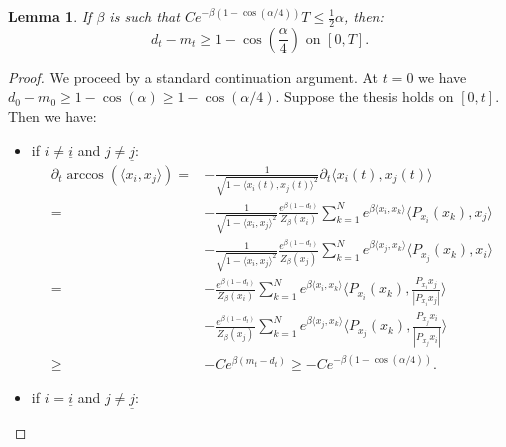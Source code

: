 \documentclass{article}
\numberwithin{theorem}{section}
\newtheorem{lemma}[theorem]{Lemma}
\begin{document}
\begin{lemma}
    \label{lem:md}
If $\beta$ is such that $Ce^{-\beta(1-\cos(\alpha/4))}T\leq\frac{1}{2}\alpha$, then: 
$$
d_t-m_t \geq 1-\cos\left(\frac{\alpha}{4}\right)\text{ on } [0,T].
$$
\end{lemma}
\begin{proof} We proceed by a standard continuation argument. 
At $t=0$ we have $d_0-m_0\geq 1-\cos(\alpha)\geq 1-\cos(\alpha/4)$.
Suppose the thesis holds on $[0,t]$.
Then we have: 
\begin{itemize}
\item if $i\neq\underline{i}$ and $j\neq\underline{j}$:
\begin{align*}
\partial_t \arccos(\langle x_i, x_j\rangle) =& -\frac{1}{\sqrt{1-\langle x_i(t), x_j(t)\rangle^2}}\partial_t \langle x_i(t), x_j(t)\rangle\\
=&-\frac{1}{\sqrt{1-\langle x_i, x_j\rangle^2}} \frac{e^{\beta(1-d_t)}}{Z_\beta(x_i)}\sum_{k=1}^N e^{\beta\langle x_i, x_k\rangle}  \langle P_{x_i}(x_k), x_j\rangle  \\
&-\frac{1}{\sqrt{1-\langle x_i, x_j\rangle^2}}\frac{e^{\beta(1-d_t)}}{Z_\beta(x_j)}\sum_{k=1}^N e^{\beta\langle x_j, x_k\rangle}  \langle P_{x_j}(x_k), x_i\rangle\\
=&-\frac{e^{\beta(1-d_t)}}{Z_\beta(x_i)}\sum_{k=1}^N e^{\beta\langle x_i, x_k\rangle}  \langle P_{x_i}(x_k), \frac{P_{x_i}x_j}{|P_{x_i}x_j|}\rangle \\
&-\frac{e^{\beta(1-d_t)}}{Z_\beta(x_j)}\sum_{k=1}^N e^{\beta\langle x_j, x_k\rangle}  \langle P_{x_j}(x_k), \frac{P_{x_j}x_i}{|P_{x_j}x_i|}\rangle\\
\geq&-Ce^{\beta(m_t-d_t)}\geq-Ce^{-\beta(1-\cos(\alpha/4))}.
\end{align*}
\item if $i=\underline{i}$ and $j\neq\underline{j}$:


\end{itemize}
\end{proof}
\end{document}
